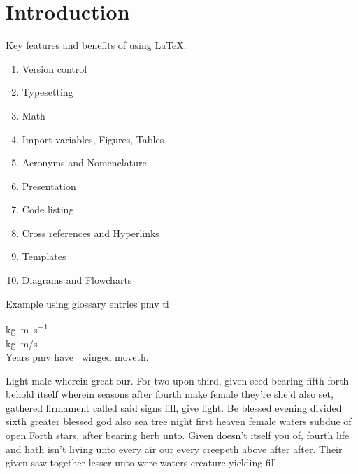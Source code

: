 

\section{Introduction}

Key features and benefits of using \LaTeX.
\begin{enumerate}
    \item Version control
    \item Typesetting
    \item Math
    \item Import variables, Figures, Tables
    \item Acronyms and Nomenclature
    \item Presentation
    \item Code listing
    \item Cross references and Hyperlinks
    \item Templates
    \item Diagrams and Flowcharts
\end{enumerate}

Example using glossary entries \gls{pmv} \gls{ti}

\unit{\kilogram\metre\per\second} \\
\unit[per-mode = symbol]
{\kilogram\metre\per\second} \\

Years \gls{pmv} have~\cite{Choi2017} winged moveth.

Light male wherein great our. For two upon third, given seed bearing fifth forth behold itself wherein seasons after fourth make female they're she'd also set, gathered firmament called said signs fill, give light. Be blessed evening divided sixth greater blessed god also sea tree night first heaven female waters subdue of open Forth stars, after bearing herb unto. Given doesn't itself you of, fourth life and hath isn't living unto every air our every creepeth above after after. Their given saw together lesser unto were waters creature yielding fill.


